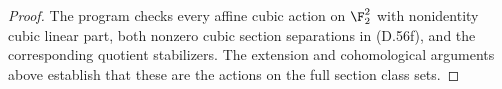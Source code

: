 \begin{proof}
The program
checks every affine cubic action on
$\F_2^2$ with nonidentity cubic linear
part, both nonzero cubic section
separations in (D.56f), and the
corresponding quotient stabilizers.
The extension and cohomological
arguments above establish that these
are the actions on the full section
class sets.
\end{proof}
